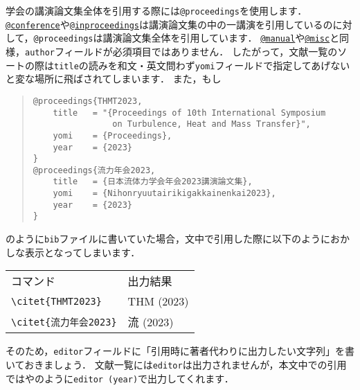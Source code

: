 \documentclass[a4paper,fleqn,uplatex,dvipdfmx]{jsarticle}
\begin{document}
学会の講演論文集全体を引用する際には\verb|@proceedings|を使用します．
\hyperref[ssec:conference]{\texttt{@conference}}や\hyperref[ssec:inproceedings]{\texttt{@inproceedings}}は講演論文集の中の一講演を引用しているのに対して，\verb|@proceedings|は講演論文集全体を引用しています．
\hyperref[ssec:manual]{\texttt{@manual}}や\hyperref[ssec:misc]{\texttt{@misc}}と同様，\verb|author|フィールドが必須項目ではありません．
したがって，文献一覧のソートの際は\verb|title|の読みを和文・英文問わず\verb|yomi|フィールドで指定してあげないと変な場所に飛ばされてしまいます．
また，もし
\begin{quote}
\begin{verbatim}
@proceedings{THMT2023,
    title   = "{Proceedings of 10th International Symposium 
                on Turbulence, Heat and Mass Transfer}",
    yomi    = {Proceedings},
    year    = {2023}
}
@proceedings{流力年会2023,
    title   = {日本流体力学会年会2023講演論文集},
    yomi    = {Nihonryuutairikigakkainenkai2023},
    year    = {2023}
}
\end{verbatim}
\end{quote}
のように\verb|bib|ファイルに書いていた場合，文中で引用した際に以下のようにおかしな表示となってしまいます．
\begin{table}[h]
    \centering
    \begin{tabular}{ll}
        コマンド    &出力結果 \\
        \verb|\citet{THMT2023}| &THM (2023) \\
        \verb|\citet{流力年会2023}| &流 (2023) \\
    \end{tabular}
\end{table}
そのため，\verb|editor|フィールドに「引用時に著者代わりに出力したい文字列」を書いておきましょう．
文献一覧には\verb|editor|は出力されませんが，本文中での引用では\citet{THMT2023}や\citet{流力年会2023}のように\verb|editor (year)|で出力してくれます．
\end{document}
